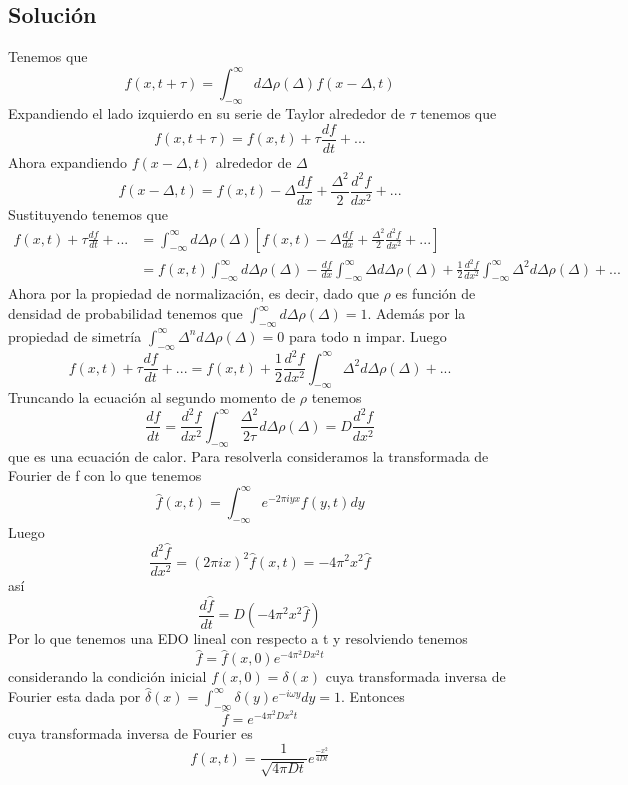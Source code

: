 \documentclass[paper=letter, fontsize=11pt]{scrartcl}
\numberwithin{equation}{section} %
\numberwithin{figure}{section} %
\numberwithin{table}{section} %
\begin{document}
\subsection{Soluci\'on}
Tenemos que $$f(x,t+\tau)=\int_{-\infty}^{\infty}d\Delta \rho(\Delta)f(x-\Delta,t)$$ Expandiendo el lado izquierdo en su serie de Taylor alrededor de $\tau$ tenemos que $$f(x,t+\tau)=f(x,t)+\tau \frac{df}{dt}+...$$ Ahora expandiendo $f(x-\Delta, t)$ alrededor de $\Delta$ $$f(x-\Delta, t)=f(x,t)-\Delta \frac{df}{dx}+\frac{\Delta^2}{2}\frac{d^2 f}{dx^2}+...$$ Sustituyendo tenemos que \begin{equation*}
\begin{split}
f(x,t)+\tau \frac{df}{dt}+...&=\int_{-\infty}^{\infty}d\Delta\rho(\Delta)\left[f(x,t)-\Delta \frac{df}{dx}+\frac{\Delta^2}{2}\frac{d^2 f}{dx^2}+...\right]\\
&= f(x,t)\int_{-\infty}^{\infty}d\Delta\rho(\Delta)-\frac{df}{dx}\int_{-\infty}^{\infty}\Delta d\Delta\rho(\Delta)+\frac{1}{2}\frac{d^2 f}{dx^2}\int_{-\infty}^{\infty}\Delta^2 d\Delta\rho(\Delta) +...
\end{split}
\end{equation*}
Ahora por la propiedad de normalizaci\'on, es decir, dado que $\rho$ es funci\'on de densidad de probabilidad tenemos que  $\int_{-\infty}^{\infty}d\Delta\rho(\Delta)=1$. Adem\'as por la propiedad de simetr\'ia  $\int_{-\infty}^{\infty}\Delta^n d\Delta\rho(\Delta)=0$ para todo n impar. Luego $$f(x,t)+\tau \frac{df}{dt}+...=f(x,t)+\frac{1}{2}\frac{d^2 f}{dx^2}\int_{-\infty}^{\infty}\Delta^2 d\Delta\rho(\Delta)+...$$ Truncando la ecuaci\'on al segundo momento de $\rho$ tenemos
$$\frac{df}{dt}=\frac{d^2 f}{dx^2}\int_{-\infty}^{\infty}\frac{\Delta^2}{2\tau} d\Delta\rho(\Delta)=D\frac{d^2 f}{dx^2}$$ que es una ecuaci\'on de calor. Para resolverla consideramos la transformada de Fourier de f con lo que tenemos $$\hat{f}(x,t)=\int_{-\infty}^{\infty} e^{-2\pi iyx}f(y,t)dy$$ Luego $$\frac{d^2\hat{f}}{dx^2}=(2\pi ix)^2\hat{f}(x,t)=-4\pi^2 x^2 \hat{f}$$ as\'i $$\frac{d\hat{f}}{dt}=D(-4\pi^2 x^2 \hat{f})$$ Por lo que tenemos una EDO lineal con respecto a t y resolviendo tenemos $$\hat{f}=\hat{f}(x,0)e^{-4\pi^2 D x^2 t}$$ considerando la condici\'on inicial $f(x,0)=\delta(x)$ cuya transformada inversa de Fourier esta dada por $\hat{\delta}(x)=\int_{-\infty}^{\infty}\delta(y)e^{-i\omega y}dy=1$. Entonces $$\hat{f}=e^{-4\pi^2 D x^2 t}$$ cuya transformada inversa de Fourier es $$f(x,t)=\frac{1}{\sqrt{4\pi Dt}}e^{\frac{-x^2}{4Dt}}$$
\end{document}
